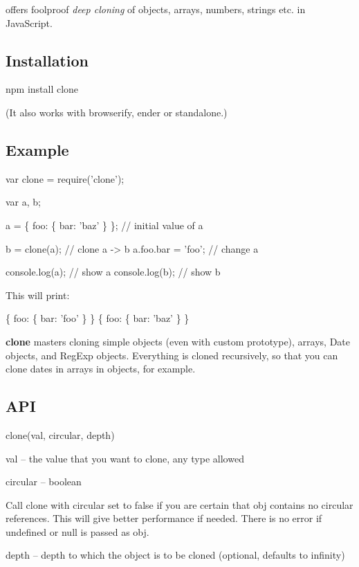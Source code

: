 \href{http://travis-ci.org/pvorb/node-clone}{\tt }

\href{http://npm-stat.com/charts.html?package=clone}{\tt }

offers foolproof {\itshape deep cloning} of objects, arrays, numbers, strings etc. in Java\+Script.

\subsection*{Installation}

\begin{DoxyVerb}npm install clone
\end{DoxyVerb}


(It also works with browserify, ender or standalone.)

\subsection*{Example}


\begin{DoxyCode}
var clone = require('clone');

var a, b;

a = \{ foo: \{ bar: 'baz' \} \};  // initial value of a

b = clone(a);                 // clone a -> b
a.foo.bar = 'foo';            // change a

console.log(a);               // show a
console.log(b);               // show b
\end{DoxyCode}


This will print\+:


\begin{DoxyCode}
\{ foo: \{ bar: 'foo' \} \}
\{ foo: \{ bar: 'baz' \} \}
\end{DoxyCode}


{\bfseries clone} masters cloning simple objects (even with custom prototype), arrays, Date objects, and Reg\+Exp objects. Everything is cloned recursively, so that you can clone dates in arrays in objects, for example.

\subsection*{A\+PI}

{\ttfamily clone(val, circular, depth)}


\begin{DoxyItemize}
\item {\ttfamily val} -- the value that you want to clone, any type allowed
\item {\ttfamily circular} -- boolean

Call {\ttfamily clone} with {\ttfamily circular} set to {\ttfamily false} if you are certain that {\ttfamily obj} contains no circular references. This will give better performance if needed. There is no error if {\ttfamily undefined} or {\ttfamily null} is passed as {\ttfamily obj}.
\item {\ttfamily depth} -- depth to which the object is to be cloned (optional, defaults to infinity)
\end{DoxyItemize}

